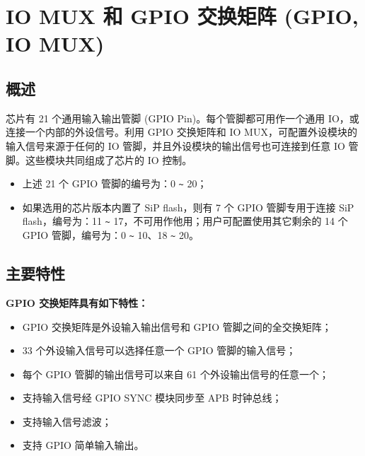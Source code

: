 \documentclass[main\_\_CN.tex]{subfiles}
\begin{document}

\ifglobal
\else
    {\let\clearpage\relax \listoftodos}
    \tableofcontents
\fi


\hypertarget{iomuxgpio}{}
\chapter{IO MUX 和 GPIO 交换矩阵 (GPIO, IO MUX)}
\label{mod:iomuxgpio}


\section{概述}

\chipname{} 芯片有 21 个通用输入输出管脚 (GPIO Pin)。每个管脚都可用作一个通用 IO，或连接一个内部的外设信号。利用 GPIO 交换矩阵和 IO MUX，可配置外设模块的输入信号来源于任何的 IO 管脚，并且外设模块的输出信号也可连接到任意 IO 管脚。这些模块共同组成了芯片的 IO 控制。

\begin{tiplisting}
\vspace{-2em}
\begin{itemize}
\item 上述 21 个 GPIO 管脚的编号为：0 \verb+~+ 20；
\item 如果选用的芯片版本内置了 SiP flash，则有 7 个 GPIO 管脚专用于连接 SiP flash，编号为：11 \verb+~+ 17，不可用作他用；用户可配置使用其它剩余的 14 个 GPIO 管脚，编号为：0 \verb+~+ 10、18 \verb+~+ 20。
\end{itemize}
\end{tiplisting}

\section{主要特性}

\textbf{GPIO 交换矩阵具有如下特性：}

\begin{itemize}
\item GPIO 交换矩阵是外设输入输出信号和 GPIO 管脚之间的全交换矩阵；
\item 33 个外设输入信号可以选择任意一个 GPIO 管脚的输入信号；
\item 每个 GPIO 管脚的输出信号可以来自 61 个外设输出信号的任意一个；
\item 支持输入信号经 GPIO SYNC 模块同步至 APB 时钟总线；
\item 支持输入信号滤波；
\item 支持 GPIO 简单输入输出。
\end{itemize}
\end{document}
